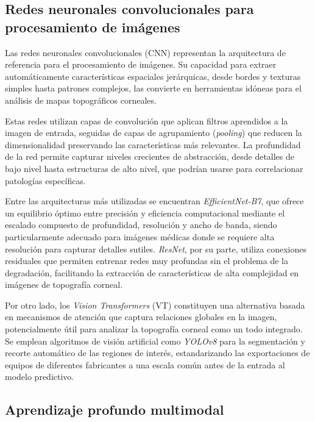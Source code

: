     \subsection{Redes neuronales convolucionales para procesamiento de imágenes}

        Las redes neuronales convolucionales (CNN) representan la arquitectura de referencia para el procesamiento de imágenes. Su capacidad para extraer automáticamente características espaciales jerárquicas, desde bordes y texturas simples hasta patrones complejos, las convierte en herramientas idóneas para el análisis de mapas topográficos corneales.
        
        Estas redes utilizan capas de convolución que aplican filtros aprendidos a la imagen de entrada, seguidas de capas de agrupamiento (\textit{pooling}) que reducen la dimensionalidad preservando las características más relevantes. La profundidad de la red permite capturar niveles crecientes de abstracción, desde detalles de bajo nivel hasta estructuras de alto nivel, que podrían usarse para correlacionar patologías específicas.

        Entre las arquitecturas más utilizadas se encuentran \textit{EfficientNet-B7}, que ofrece un equilibrio óptimo entre precisión y eficiencia computacional mediante el escalado compuesto de profundidad, resolución y ancho de banda, siendo particularmente adecuado para imágenes médicas donde se requiere alta resolución para capturar detalles sutiles. \textit{ResNet}, por su parte, utiliza conexiones residuales que permiten entrenar redes muy profundas sin el problema de la degradación, facilitando la extracción de características de alta complejidad en imágenes de topografía corneal. 
        
        Por otro lado, los \textit{Vision Transformers} (VT) constituyen una alternativa basada en mecanismos de atención que captura relaciones globales en la imagen, potencialmente útil para analizar la topografía corneal como un todo integrado. Se emplean algoritmos de visión artificial como \textit{YOLOv8} para la segmentación y recorte automático de las regiones de interés, estandarizando las exportaciones de equipos de diferentes fabricantes a una escala común antes de la entrada al modelo predictivo.

    \subsection{Aprendizaje profundo multimodal}

